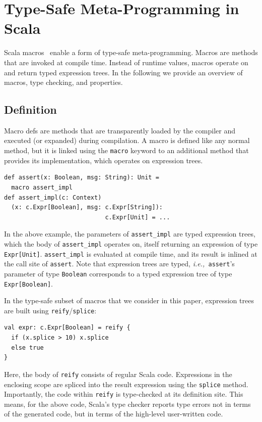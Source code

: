 \documentclass[preprint,nocopyrightspace]{sigplanconf}
\newcommand{\ie}{{\em i.e.,~}}
\begin{document}
\section{Type-Safe Meta-Programming in Scala}
\label{sec:macros}

Scala macros~\cite{Burmako2012, Burmako2013} enable a form of type-safe
meta-programming. Macros are methods that are invoked at compile time. Instead of
runtime values, macros operate on and return typed expression trees. In the
following we provide an overview of macros, type checking, and properties.

\subsection{Definition}

Macro defs are methods that are transparently loaded by
the compiler and executed (or expanded) during compilation. A macro is defined
like any normal method, but it is linked using the \verb|macro| keyword to an
additional method that provides its implementation, which operates on
expression trees.
\begin{lstlisting}
def assert(x: Boolean, msg: String): Unit =
  macro assert_impl
def assert_impl(c: Context)
  (x: c.Expr[Boolean], msg: c.Expr[String]):
                            c.Expr[Unit] = ...
\end{lstlisting}
\noindent
In the above example, the parameters of \verb|assert_impl| are typed
expression trees, which the body of \verb|assert_impl| operates on, itself
returning an expression of type \verb|Expr[Unit]|. \verb|assert_impl|
is evaluated at compile time, and its result is inlined at
the call site of \verb|assert|.
Note that expression trees are typed, \ie \verb|assert|'s parameter of type
\verb|Boolean| corresponds to a typed expression tree of type
\verb|Expr[Boolean]|.

In the type-safe subset of macros that we consider in this paper,
expression trees are built using \verb|reify|/\verb|splice|:
\begin{lstlisting}
val expr: c.Expr[Boolean] = reify {
  if (x.splice > 10) x.splice
  else true
}
\end{lstlisting}
\noindent
Here, the body of \verb|reify| consists of regular Scala code. Expressions in
the enclosing scope are spliced into the result expression using the
\verb|splice| method. Importantly, the code within \verb|reify| is
type-checked at its definition site. This means, for the above code, Scala's type
checker reports type errors not in terms of the generated code, but in terms
of the high-level user-written code.
\end{document}
